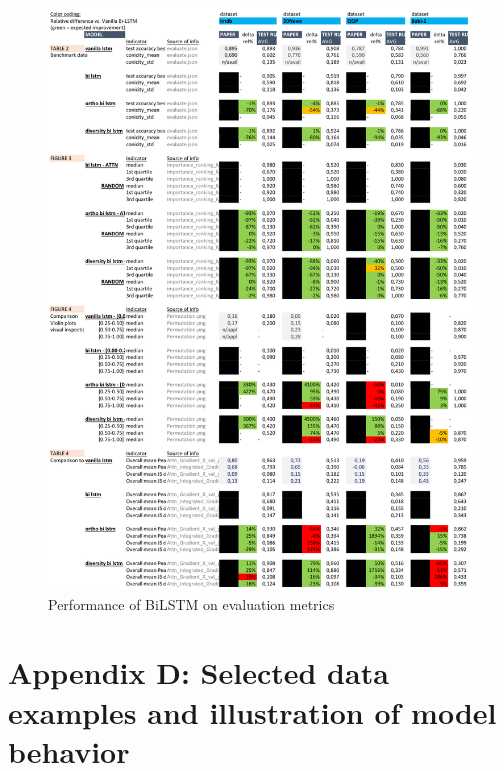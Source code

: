 \begin{figure}[h]
\includegraphics[scale=0.7, left]{./figures/bilstm_results.pdf}
\caption{Performance of BiLSTM on evaluation metrics}
\label{fig:results_bilstm}
\end{figure}

\newpage

\section*{Appendix D: Selected data examples and illustration of model behavior}

